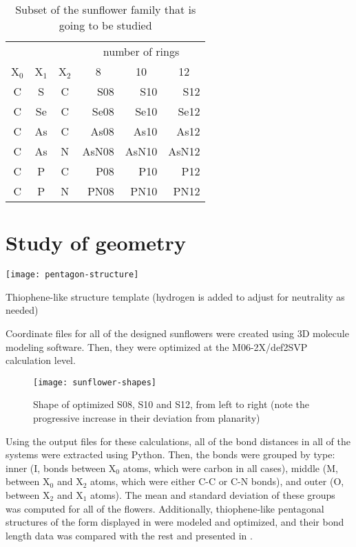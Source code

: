 \begin{table}
    \centering
    \caption[Sunflowers in this study]{Subset of the sunflower family that is going to be studied}
    \begin{tabular}{@{}cccrrr@{}}
        \toprule
        &&& \multicolumn{3}{c}{number of rings} \\
        X$_0$ & X$_1$ & X$_2$ & \multicolumn{1}{c}{8} & \multicolumn{1}{c}{10} & \multicolumn{1}{c}{12} \\
        \midrule
        C & S & C & S08 & S10 & S12 \\
        C & Se & C & Se08 & Se10 & Se12 \\
        C & As & C & As08 & As10 & As12 \\
        C & As & N & AsN08 & AsN10 & AsN12 \\
        C & P & C & P08 & P10 & P12 \\
        C & P & N & PN08 & PN10 & PN12 \\
        \bottomrule
    \end{tabular}
\end{table}


\section{Study of geometry}

\begin{marginfigure}
    \texttt{[image: pentagon-structure]}
    \caption[Thiophene-like structure template]{Thiophene-like structure template (hydrogen is added to adjust for neutrality as needed)}
\end{marginfigure}

Coordinate files for all of the designed sunflowers were created using 3D molecule modeling software.
Then, they were optimized at the M06-2X/def2SVP calculation level.

\begin{figure}
    \texttt{[image: sunflower-shapes]}
    \caption[Shape of the sunflowers]{Shape of optimized S08, S10 and S12, from left to right (note the progressive increase in their deviation from planarity)}
\end{figure}

Using the output files for these calculations, all of the bond distances in all of the systems were extracted using Python.
Then, the bonds were grouped by type: inner (I, bonds between X$_0$ atoms, which were carbon in all cases), middle (M, between X$_0$ and X$_2$ atoms, which were either C-C or C-N bonds), and outer (O, between X$_2$ and X$_1$ atoms).
The mean and standard deviation of these groups was computed for all of the flowers.
Additionally, thiophene-like pentagonal structures of the form displayed in  were modeled and optimized, and their bond length data was compared with the rest and presented in .

